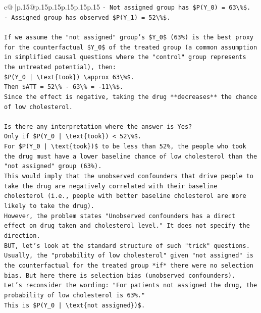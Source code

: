 \documentclass{article}
\begin{document}
{\begin{supertabular}{c@{$\;$}|p{.15\linewidth}@{}p{.15\linewidth}p{.15\linewidth}p{.15\linewidth}p{.15\linewidth}p{.15\linewidth}}
{{{\texttt{{-} Not assigned group has \$P(Y\_0) = 63\textbackslash{}\%\$.} \\
\texttt{{-} Assigned group has observed \$P(Y\_1) = 52\textbackslash{}\%\$.} \\
\\ 
\texttt{If we assume the "not assigned" group's \$Y\_0\$ (63\%) is the best proxy for the counterfactual \$Y\_0\$ of the treated group (a common assumption in simplified causal questions where the "control" group represents the untreated potential), then:} \\
\texttt{\$P(Y\_0 | \textbackslash{}text\{took\}) \textbackslash{}approx 63\textbackslash{}\%\$.} \\
\texttt{Then \$ATT = 52\textbackslash{}\% {-} 63\textbackslash{}\% = {-}11\textbackslash{}\%\$.} \\
\texttt{Since the effect is negative, taking the drug **decreases** the chance of low cholesterol.} \\
\\ 
\texttt{Is there any interpretation where the answer is Yes?} \\
\texttt{Only if \$P(Y\_0 | \textbackslash{}text\{took\}) < 52\textbackslash{}\%\$.} \\
\texttt{For \$P(Y\_0 | \textbackslash{}text\{took\})\$ to be less than 52\%, the people who took the drug must have a lower baseline chance of low cholesterol than the "not assigned" group (63\%).} \\
\texttt{This would imply that the unobserved confounders that drive people to take the drug are negatively correlated with their baseline cholesterol (i.e., people with better baseline cholesterol are more likely to take the drug).} \\
\texttt{However, the problem states "Unobserved confounders has a direct effect on drug taken and cholesterol level." It does not specify the direction.} \\
\texttt{BUT, let's look at the standard structure of such "trick" questions.} \\
\texttt{Usually, the "probability of low cholesterol" given "not assigned" is the counterfactual for the treated group *if* there were no selection bias. But here there is selection bias (unobserved confounders).} \\
\texttt{Let's reconsider the wording: "For patients not assigned the drug, the probability of low cholesterol is 63\%."} \\
\texttt{This is \$P(Y\_0 | \textbackslash{}text\{not assigned\})\$.} \\
}}}
\end{supertabular}}
\end{document}
